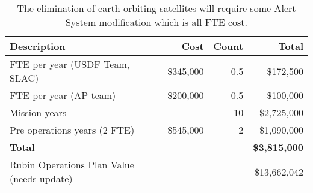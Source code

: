 \tiny \begin{longtable} {|l|r|r|r|} \caption{The elimination of earth-orbiting satellites will require some Alert System modification which is all FTE cost. \label{tab:eliminate}}\\ 
\hline 
\textbf{Description}&\textbf{Cost}&\textbf{Count}&\textbf{Total} \\ \hline
{FTE per year (USDF Team, SLAC)}&{\$345,000}&{0.5}&{\$172,500} \\ \hline
{FTE per year (AP team)}&{\$200,000}&{0.5}&{\$100,000} \\ \hline
{Mission years}&{}&{10}&{\$2,725,000} \\ \hline
{Pre operations years (2 FTE)}&{\$545,000}&{2}&{\$1,090,000} \\ \hline
\textbf{Total }&\textbf{}&\textbf{}&\textbf{\$3,815,000} \\ \hline
{Rubin Operations Plan Value (needs update)}&{}&{}&{\$13,662,042} \\ \hline
\end{longtable} \normalsize
